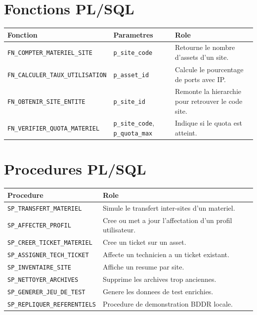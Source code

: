\documentclass[11pt,a4paper]{article}
\begin{document}
\section{Fonctions PL/SQL}

\begin{longtable}{|p{5cm}|p{4cm}|p{5cm}|}
\hline
\textbf{Fonction} & \textbf{Parametres} & \textbf{Role} \\
\hline
\texttt{FN\_COMPTER\_MATERIEL\_SITE} & \texttt{p\_site\_code} & Retourne le nombre d'assets d'un site. \\
\hline
\texttt{FN\_CALCULER\_TAUX\_UTILISATION} & \texttt{p\_asset\_id} & Calcule le pourcentage de ports avec IP. \\
\hline
\texttt{FN\_OBTENIR\_SITE\_ENTITE} & \texttt{p\_site\_id} & Remonte la hierarchie pour retrouver le code site. \\
\hline
\texttt{FN\_VERIFIER\_QUOTA\_MATERIEL} & \texttt{p\_site\_code}, \texttt{p\_quota\_max} & Indique si le quota est atteint. \\
\hline
\end{longtable}

\section{Procedures PL/SQL}

\begin{longtable}{|p{5cm}|p{9cm}|}
\hline
\textbf{Procedure} & \textbf{Role} \\
\hline
\texttt{SP\_TRANSFERT\_MATERIEL} & Simule le transfert inter-sites d'un materiel. \\
\hline
\texttt{SP\_AFFECTER\_PROFIL} & Cree ou met a jour l'affectation d'un profil utilisateur. \\
\hline
\texttt{SP\_CREER\_TICKET\_MATERIEL} & Cree un ticket sur un asset. \\
\hline
\texttt{SP\_ASSIGNER\_TECH\_TICKET} & Affecte un technicien a un ticket existant. \\
\hline
\texttt{SP\_INVENTAIRE\_SITE} & Affiche un resume par site. \\
\hline
\texttt{SP\_NETTOYER\_ARCHIVES} & Supprime les archives trop anciennes. \\
\hline
\texttt{SP\_GENERER\_JEU\_DE\_TEST} & Genere les donnees de test enrichies. \\
\hline
\texttt{SP\_REPLIQUER\_REFERENTIELS} & Procedure de demonstration BDDR locale. \\
\hline
\end{longtable}
\end{document}
